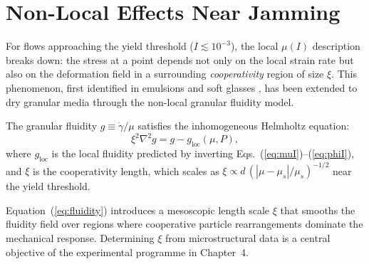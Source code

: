 \section{Non-Local Effects Near Jamming}

For flows approaching the yield threshold ($I \lesssim 10^{-3}$), the local $\mu(I)$ description breaks down: the stress at a point depends not only on the local strain rate but also on the deformation field in a surrounding \textit{cooperativity} region of size $\xi$. This phenomenon, first identified in emulsions and soft glasses \cite{Goyon2008,Kamrin2012}, has been extended to dry granular media through the non-local granular fluidity model.

\begin{theorembox}[title=Non-local granular fluidity model]
The granular fluidity $g \equiv \dot{\gamma}/\mu$ satisfies the inhomogeneous Helmholtz equation:
\begin{equation}\label{eq:fluidity}
\xi^2 \nabla^2 g = g - g_{\text{loc}}(\mu, P),
\end{equation}
where $g_{\text{loc}}$ is the local fluidity predicted by inverting Eqs.~(\ref{eq:muI})--(\ref{eq:phiI}), and $\xi$ is the cooperativity length, which scales as $\xi \propto d\,(|\mu - \mu_s|/\mu_s)^{-1/2}$ near the yield threshold.
\end{theorembox}

Equation~(\ref{eq:fluidity}) introduces a mesoscopic length scale $\xi$ that smooths the fluidity field over regions where cooperative particle rearrangements dominate the mechanical response. Determining $\xi$ from microstructural data is a central objective of the experimental programme in Chapter~4.
